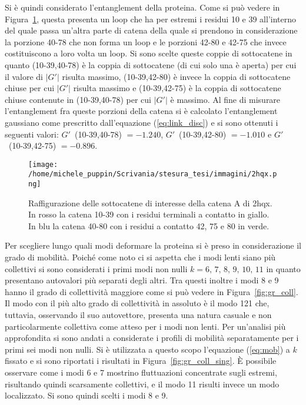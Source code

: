 Si è quindi considerato l'entanglement della proteina. Come si può vedere in Figura~\ref{fig:2hqx}, questa presenta un loop che ha per estremi i residui 10 e 39 all'interno del quale passa un'altra parte di catena della quale si prendono in considerazione la porzione 40-78 che non forma un loop e le porzioni 42-80 e 42-75 che invece costituiscono a loro volta un loop. Si sono scelte queste coppie di sottocatene in quanto (10-39,40-78) è la coppia di sottocatene (di cui solo una è aperta) per cui il valore di $ \lvert G'\rvert $ risulta massimo, (10-39,42-80) è invece la coppia di sottocatene chiuse per cui $ \lvert G'\rvert $ risulta massimo e (10-39,42-75) è la coppia di sottocatene chiuse contenute in (10-39,40-78) per cui $ \lvert G'\rvert $ è massimo.
Al fine di misurare l'entanglement fra queste porzioni della catena si è calcolato l'entanglement gaussiano come prescritto dall'equazione (\ref{eq:link_disc}) e si sono ottenuti i seguenti valori: $ G' $~(10-39,40-78) $ = -1.240 $, $ G' $~(10-39,42-80) $ = -1.010 $ e $ G' $~(10-39,42-75) $ = -0.896 $.
\begin{figure}[h]
	\centering
	\texttt{[image: /home/michele\_puppin/Scrivania/stesura\_tesi/immagini/2hqx.png]}
	\caption{Raffigurazione delle sottocatene di interesse della catena A di 2hqx. In rosso la catena 10-39 con i residui terminali a contatto in giallo. In blu la catena 40-80 con i residui a contatto 42, 75 e 80 in verde.}
	\label{fig:2hqx}
\end{figure}

Per scegliere lungo quali modi deformare la proteina si è preso in considerazione il grado di mobilità. Poiché come noto ci si aspetta che i modi lenti siano più collettivi si sono considerati i primi modi non nulli $ k=6, \, 7, \, 8, \, 9, \, 10, \, 11 $ in quanto presentano autovalori più separati degli altri. Tra questi inoltre i modi 8 e 9 hanno il grado di collettività maggiore come si può vedere in Figura~\ref{fig:gr_coll}. Il modo con il più alto grado di collettività in assoluto è il modo 121 che, tuttavia, osservando il suo autovettore, presenta una natura casuale e non particolarmente collettiva come atteso per i modi non lenti. Per un'analisi più approfondita si sono andati a considerate i profili di mobilità separatamente per i primi sei modi non nulli. Si è utilizzata a questo scopo l'equazione (\ref{eq:mob}) a $ k $ fissato e si sono riportati i risultati in Figura~\ref{fig:gr_coll_sing}. È possibile osservare come i modi 6 e 7 mostrino fluttuazioni concentrate sugli estremi, risultando quindi scarsamente collettivi, e il modo 11 risulti invece un modo localizzato. Si sono quindi scelti i modi 8 e 9.


